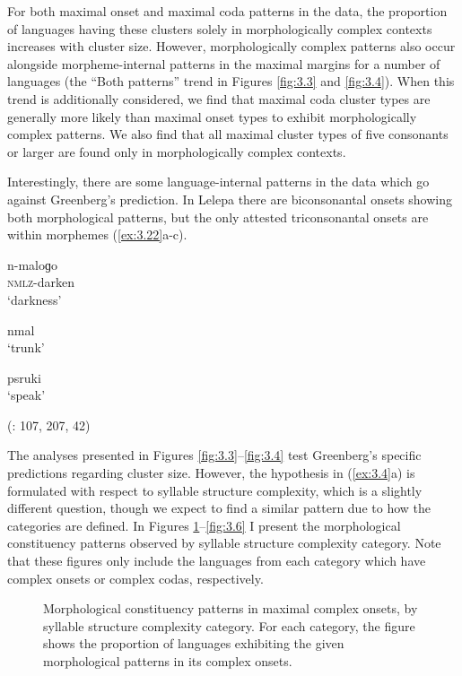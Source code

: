   For both maximal onset and maximal coda patterns in the data, the proportion of languages having these clusters solely in morphologically complex contexts increases with cluster size. However, morphologically complex patterns also occur alongside morpheme-internal patterns in the maximal margins for a number of languages (the “Both patterns” trend in Figures \ref{fig:3.3} and \ref{fig:3.4}). When this trend is additionally considered, we find that maximal coda cluster types are generally more likely than maximal onset types to exhibit morphologically complex patterns. We also find that all maximal cluster types of five consonants or larger are found only in morphologically complex contexts.

  Interestingly, there are some language-internal patterns in the data which go against Greenberg’s prediction. In Lelepa there are biconsonantal onsets showing both morphological patterns, but the only attested triconsonantal onsets are within morphemes (\ref{ex:3.22}a-c).

\ea\label{ex:3.22}

\ea  n-maloɡo\\
\textsc{nmlz}-darken\\
\glt ‘darkness’

\ex  nmal\\
\glt ‘trunk’

\ex  psruki\\
\glt ‘speak’

(\citealt{Lacrampe2014}: 107, 207, 42)
\z
\z

  The analyses presented in Figures \ref{fig:3.3}--\ref{fig:3.4} test Greenberg’s specific predictions regarding cluster size. However, the hypothesis in (\ref{ex:3.4}a) is formulated with respect to syllable structure complexity, which is a slightly different question, though we expect to find a similar pattern due to how the categories are defined. In Figures \ref{fig:3.5}--\ref{fig:3.6} I present the morphological constituency patterns observed by syllable structure complexity category. Note that these figures only include the languages from each category which have complex onsets or complex codas, respectively.


\begin{figure}  
\caption{\label{fig:3.5} Morphological constituency patterns in maximal complex onsets, by syllable structure complexity category. For each category, the figure shows the proportion of languages exhibiting the given morphological patterns in its complex onsets.}
\end{figure}


